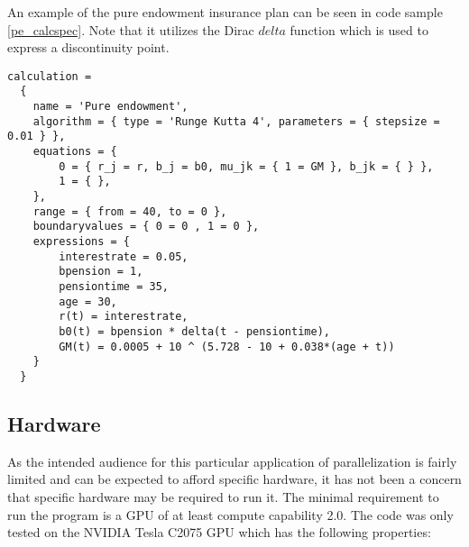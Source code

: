 {An example of the pure endowment insurance plan can be seen in code sample \ref{pe_calcspec}. Note that it utilizes the Dirac $delta$ function which is used to express a discontinuity point.%

\begin{lstlisting}[caption=The pure endowment insurance plan expressed in CalcSpec, label=pe_calcspec]
calculation = 
  {
    name = 'Pure endowment',
    algorithm = { type = 'Runge Kutta 4', parameters = { stepsize = 0.01 } },
    equations = { 
        0 = { r_j = r, b_j = b0, mu_jk = { 1 = GM }, b_jk = { } },
        1 = { },
    },
    range = { from = 40, to = 0 },
    boundaryvalues = { 0 = 0 , 1 = 0 },
    expressions = {
        interestrate = 0.05,
        bpension = 1,
        pensiontime = 35,
        age = 30,
        r(t) = interestrate,
        b0(t) = bpension * delta(t - pensiontime),
        GM(t) = 0.0005 + 10 ^ (5.728 - 10 + 0.038*(age + t))
    }
  }
\end{lstlisting}

\subsection{Hardware}
As the intended audience for this particular application of parallelization is fairly limited and can be expected to afford specific hardware, it has not been a concern that specific hardware may be required to run it.
The minimal requirement to run the program is a GPU of at least compute capability 2.0.
The code was only tested on the NVIDIA Tesla C2075 GPU which has the following properties:

}
